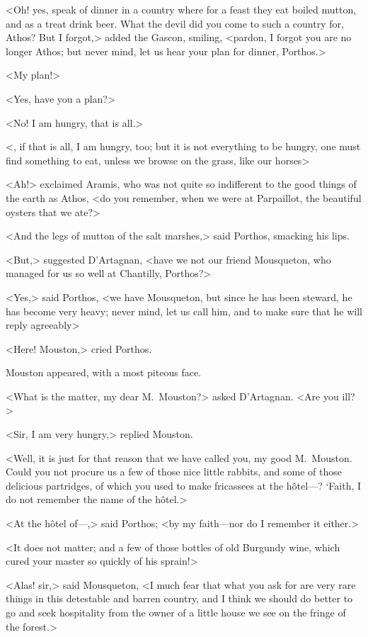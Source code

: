 <Oh! yes, speak of dinner in a country where for a feast they eat boiled mutton, and as a treat drink beer. What the devil did you come to such a country for, Athos? But I forgot,> added the Gascon, smiling, <pardon, I forgot you are no longer Athos; but never mind, let us hear your plan for dinner, Porthos.>

<My plan!>

<Yes, have you a plan?>

<No! I am hungry, that is all.>

<, if that is all, I am hungry, too; but it is not everything to be hungry, one must find something to eat, unless we browse on the grass, like our horses\longdash>

<Ah!> exclaimed Aramis, who was not quite so indifferent to the good things of the earth as Athos, <do you remember, when we were at Parpaillot, the beautiful oysters that we ate?>

<And the legs of mutton of the salt marshes,> said Porthos, smacking his lips.

<But,> suggested D'Artagnan, <have we not our friend Mousqueton, who managed for us so well at Chantilly, Porthos?>

<Yes,> said Porthos, <we have Mousqueton, but since he has been steward, he has become very heavy; never mind, let us call him, and to make sure that he will reply agreeably\longdash>

<Here! Mouston,> cried Porthos.

Mouston appeared, with a most piteous face.

<What is the matter, my dear M.~Mouston?> asked D'Artagnan. <Are you ill?>

<Sir, I am very hungry,> replied Mouston.

<Well, it is just for that reason that we have called you, my good M.~Mouston. Could you not procure us a few of those nice little rabbits, and some of those delicious partridges, of which you used to make fricassees at the hôtel—? ‘Faith, I do not remember the name of the hôtel.>

<At the hôtel of—,> said Porthos; <by my faith—nor do I remember it either.>

<It does not matter; and a few of those bottles of old Burgundy wine, which cured your master so quickly of his sprain!>

<Alas! sir,> said Mousqueton, <I much fear that what you ask for are very rare things in this detestable and barren country, and I think we should do better to go and seek hospitality from the owner of a little house we see on the fringe of the forest.>

